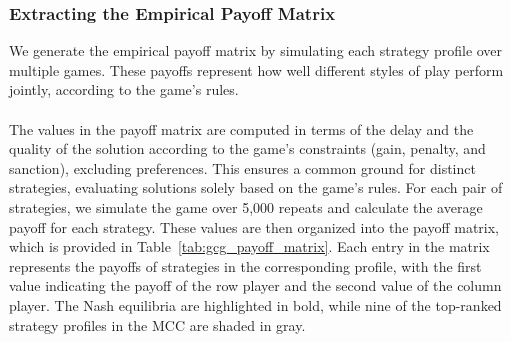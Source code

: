 \begin{flushleft}
    \subsubsection{Extracting the Empirical Payoff Matrix}

    \begin{flushleft}

        We generate the empirical payoff matrix by simulating each strategy profile over multiple games. These payoffs represent how well different styles of play perform jointly, according to the game’s rules.\\~\\

        The values in the payoff matrix are computed in terms of the delay and the quality of the solution according to the game's constraints (gain, penalty, and sanction), excluding preferences. This ensures a common ground for distinct strategies, evaluating solutions solely based on the game's rules. For each pair of strategies, we simulate the game over 5,000 repeats and calculate the average payoff for each strategy. These values are then organized into the payoff matrix, which is provided in Table~\ref{tab:gcg_payoff_matrix}. Each entry in the matrix represents the payoffs of strategies in the corresponding profile, with the first value indicating the payoff of the row player and the second value of the column player. The Nash equilibria are highlighted in bold, while nine of the top-ranked strategy profiles in the MCC are shaded in gray.\\~\\
        \begin{table}[h!]
            \centering
            \caption{Empirical Payoff Matrix for the Graph Coloring Game}
            \label{tab:gcg_payoff_matrix}
            \vspace{0.5em}
\end{table}
\end{flushleft}
\end{flushleft}
